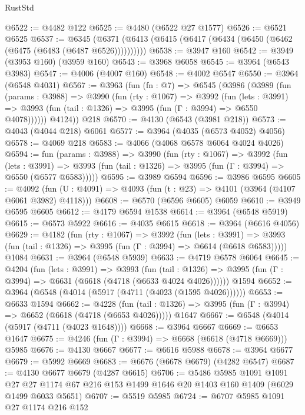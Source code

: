 \begin{lexlean}{RustStd}
\begin{coremodule}
{\begin{coremodule}
{{{{{{{{{{{{{{{{{{{{{{{{{{{{{{{{{{{{{{@6522 := @4482 @122
@6525 := @4480 (@6522 @27 @1577)
@6526 := @6521 @6525
@6537 := @6345 (@6371 (@6413 (@6415 (@6417 (@6434 (@6450 (@6462 (@6475 (@6483 (@6487 @6526))))))))))
@6538 := @3947 @160
@6542 := @3949 (@3953 @160) (@3959 @160)
@6543 := @3968 @6058
@6545 := @3964 (@6543 @3983)
@6547 := @4006 (@4007 @160)
@6548 := @4002 @6547
@6550 := @3964 (@6548 @4031)
@6567 := @3963
    (fun (fn : @7) =>
    @6545
      (@3986
        (@3989
          (fun (params : @3988) =>
          @3990
            (fun (rty : @1067) =>
            @3992
              (fun (lets : @3991) =>
              @3993 (fun (tail : @1326) => @3995 (fun (Γ : @3994) => @6550 @4078))))))
        @4124))
    @218
@6570 := @4130 (@6543 (@3981 @218))
@6573 := @4043 (@4044 @218) @6061
@6577 := @3964 (@4035 (@6573 @4052) @4056)
@6578 := @4069 @218
@6583 := @4066 (@4068 @6578 @6064 @4024 @4026)
@6594 := fun (params : @3988) =>
  @3990
    (fun (rty : @1067) =>
    @3992
      (fun (lets : @3991) =>
      @3993 (fun (tail : @1326) => @3995 (fun (Γ : @3994) => @6550 (@6577 @6583)))))
@6595 := @3989 @6594
@6596 := @3986 @6595
@6605 := @4092 (fun (U : @4091) => @4093 (fun (t : @23) => @4101 (@3964 (@4107 @6061 @3982) @4118)))
@6608 := @6570 (@6596 @6605) @6059
@6610 := @3949 @6595 @6605
@6612 := @4179 @6594 @1538
@6614 := @3964 (@6548 @5919)
@6615 := @6573 @5922
@6616 := @4035 @6615
@6618 := @3964 (@6616 @4056)
@6629 := @4182
    (fun (rty : @1067) =>
    @3992
      (fun (lets : @3991) =>
      @3993 (fun (tail : @1326) => @3995 (fun (Γ : @3994) => @6614 (@6618 @6583)))))
    @1084
@6631 := @3964 (@6548 @5939)
@6633 := @4719 @6578 @6064
@6645 := @4204
    (fun (lets : @3991) =>
    @3993
      (fun (tail : @1326) => @3995 (fun (Γ : @3994) => @6631 (@6618 (@4718 (@6633 @4024 @4026))))))
    @1594
@6652 := @3964 (@6548 (@4014 (@5917 (@4711 (@4023 (@1595 @4026))))))
@6653 := @6633 @1594
@6662 := @4228
    (fun (tail : @1326) => @3995 (fun (Γ : @3994) => @6652 (@6618 (@4718 (@6653 @4026)))))
    @1647
@6667 := @6548 (@4014 (@5917 (@4711 (@4023 @1648))))
@6668 := @3964 @6667
@6669 := @6653 @1647
@6675 := @4246 (fun (Γ : @3994) => @6668 (@6618 (@4718 @6669))) @5985
@6676 := @4130 @6667
@6677 := @6616 @5988
@6678 := @3964 @6677
@6679 := @5992 @6669
@6683 := @6676 (@6678 @6679) (@4282 @6547)
@6687 := @4130 @6677 @6679 (@4287 @6615)
@6706 := @5486
    @5985
    @1091
    @1091
    @27
    @27
    @1174
    @67
    @216
    @153
    @1499
    @1646
    @20
    @1403
    @160
    @1409
    (@6029 @1499 @6033 @5651)
@6707 := @5519 @5985
@6724 := @6707
    @5985
    @1091
    @27
    @1174
    @216
    @152
}}}}}}}}}}}}}}}}}}}}}}}}}}}}}}}}}}}}}}
\end{coremodule}}
\end{coremodule}
\end{lexlean}
